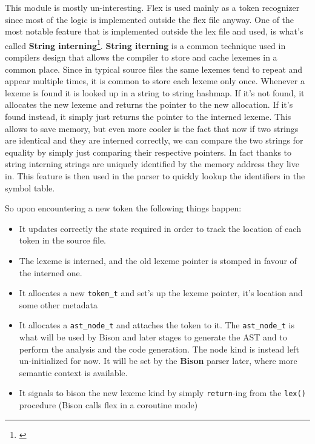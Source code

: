 \documentclass[a4paper]{article}
\newcommand{\urlref}[3][blue]{\href{#2}{\color{#1}{#3}}}%
\begin{document}
This module is mostly un-interesting. Flex is used mainly as a token recognizer since most of the logic is implemented outside the flex
file anyway. One of the most notable feature that is implemented outside the lex file and used,
is what's called \textbf{String interning}\footnote{\urlref{https://en.wikipedia.org/wiki/String_interning}{String Interning Wikipedia Article}}.
\textbf{String iterning} is a common technique used in compilers design that allows the compiler to
store and cache lexemes in a common place. Since in typical source files
the same lexemes tend to repeat and appear multiple times, it is common to store each lexeme only once. Whenever
a lexeme is found it is looked up in a string to string hashmap. If it's not found, it allocates
the new lexeme and returns the pointer to the new allocation. If it's found instead, it simply just returns the pointer to the interned lexeme. This allows to save
memory, but even more cooler is the fact that now if two strings are identical and they are interned correctly,
we can compare the two strings for equality by simply just comparing their respective pointers. In fact
thanks to string interning strings are uniquely identified by the memory address they live in.
This feature is then used in the parser
to quickly lookup the identifiers in the symbol table.

So upon encountering a new token the following things happen:

\begin{itemize}
\item It updates correctly the state required in order to track the location of each token in the source file.
\item The lexeme is interned, and the old lexeme pointer is stomped in favour of the interned one.
\item It allocates a new \texttt{token\_t} and set's up the lexeme pointer, it's location and some other metadata
\item It allocates a \texttt{ast\_node\_t} and attaches the token to it. The \texttt{ast\_node\_t} is what will be
    used by Bison and later stages to generate the AST and to perform the analysis and the code generation. The node
    kind is instead left un-initialized for now. It will be set by the \textbf{Bison} parser later, where more semantic context is available.
\item It signals to bison the new lexeme kind by simply \texttt{return}-ing from the \texttt{lex()} procedure (Bison calls flex in a coroutine mode)
\end{itemize}
\end{document}

